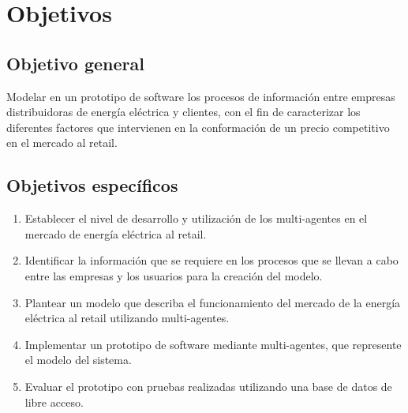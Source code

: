 \section{Objetivos}

\subsection{Objetivo general}

Modelar en un prototipo de software los procesos de información entre empresas distribuidoras de energía eléctrica  y clientes, con el fin de caracterizar los diferentes factores que intervienen en la conformación de un precio competitivo en el mercado al retail.
\subsection{Objetivos espec\'ificos}

\begin{enumerate}

\item Establecer el nivel de desarrollo y utilización de los multi-agentes en el mercado de energía eléctrica al retail.
\item Identificar la información que se requiere en los procesos que se llevan a cabo entre las empresas y los usuarios para la creación del modelo.
\item Plantear un modelo que describa el funcionamiento del mercado de la energía eléctrica al retail utilizando multi-agentes.
\item Implementar un prototipo de software mediante multi-agentes, que represente el modelo del sistema.
\item Evaluar el prototipo con pruebas realizadas utilizando una base de datos de libre acceso.

\end{enumerate}






